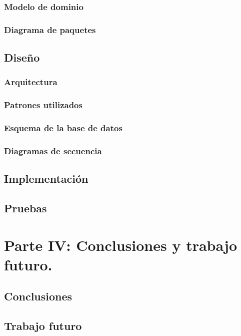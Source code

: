 \documentclass[twoside]{report}
\begin{document}
\subsection{Modelo de dominio}
\subsection{Diagrama de paquetes}
\section{Diseño}
\subsection{Arquitectura}
\subsection{Patrones utilizados}
\subsection{Esquema de la base de datos}
\subsection{Diagramas de secuencia}
\section{Implementación}
\section{Pruebas}

\chapter{Parte IV: Conclusiones y trabajo futuro.}
\section{Conclusiones}
\section{Trabajo futuro}
\end{document}
